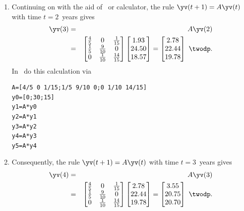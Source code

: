 \begin{example}[orangutans]
\begin{solution}
\begin{enumerate}
\item Continuing on with the aid of \script\ or calculator, the rule \(\yv(t+1)=A\yv(t)\) with time \(t=2\)~years gives
\begin{eqnarray*}
\yv(3)&=&A\yv(2)
\\&=&\begin{bmatrix} \frac45&0&\frac1{15}
\\\frac15&\frac9{10}&0
\\0&\frac1{10}&\frac{14}{15} \end{bmatrix}
\begin{bmatrix} 1.93\\24.50\\18.57 \end{bmatrix}
=\begin{bmatrix} 2.78\\22.44\\19.78 \end{bmatrix}\ \twodp.
\end{eqnarray*}
In \script\ do this calculation via
\begin{verbatim}
A=[4/5 0 1/15;1/5 9/10 0;0 1/10 14/15]
y0=[0;30;15]
y1=A*y0
y2=A*y1
y3=A*y2
y4=A*y3
y5=A*y4
\end{verbatim}
\setbox\ajrqrbox\hbox{}%
\marginajrbox%

\item Consequently, the rule \(\yv(t+1)=A\yv(t)\) with time \(t=3\)~years gives
\begin{eqnarray*}
\yv(4)&=&A\yv(3)
\\&=&\begin{bmatrix} \frac45&0&\frac1{15}
\\\frac15&\frac9{10}&0
\\0&\frac1{10}&\frac{14}{15} \end{bmatrix}
\begin{bmatrix} 2.78\\22.44\\19.78 \end{bmatrix}
=\begin{bmatrix} 3.55\\20.75\\20.70 \end{bmatrix}\ \twodp.
\end{eqnarray*}
  

\end{enumerate}
\end{solution}
\end{example}

